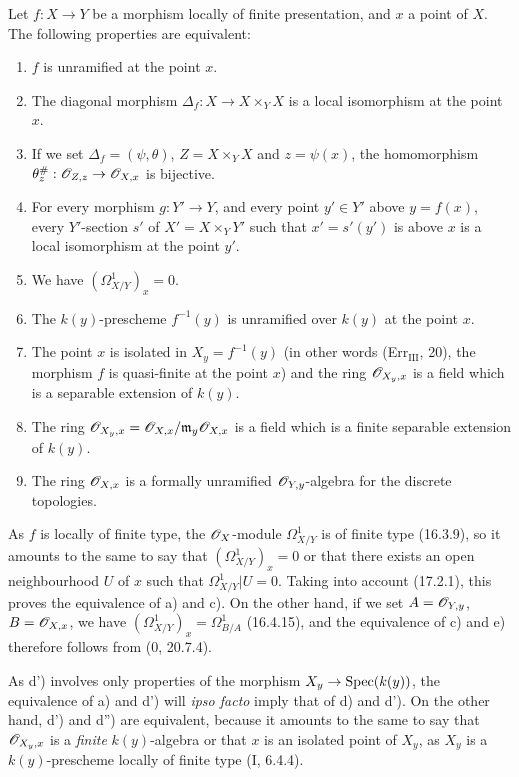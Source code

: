 \begin{theorem}[17.4.1]
\label{IV.17.4.1}
Let $f:X\to Y$ be a morphism locally of finite presentation, and $x$ a point of $X$. The following properties are equivalent:
\begin{enumerate}
  \item[a)] $f$ is unramified at the point $x$.
  \item[b)] The diagonal morphism $\Delta_f:X\to X\times_Y X$ is a local isomorphism at the point $x$.
  \item[b')] If we set $\Delta_f=(\psi,\theta)$, $Z=X\times_Y X$ and $z=\psi(x)$, the homomorphism $\theta_z^\#:\mathscr{O}_{Z,z}\to\mathscr{O}_{X,x}$ is bijective.
  \item[b'')] For every morphism $g:Y'\to Y$, and every point $y'\in Y'$ above $y=f(x)$, every $Y'$-section $s'$ of $X'=X\times_Y Y'$ such that $x'=s'(y')$ is above $x$ is a local isomorphism at the point $y'$.
  \item[c)] We have $(\Omega^1_{X/Y})_x=0$.
  \item[d)] The $k(y)$-prescheme $f^{-1}(y)$ is unramified over $k(y)$ at the point $x$.
  \item[d')] The point $x$ is isolated in $X_y=f^{-1}(y)$ (in other words (Err$_{\mathrm{III}}$, 20), the morphism $f$ is quasi-finite at the point $x$) and the ring $\mathscr{O}_{X_y,x}$ is a field which is a separable extension of $k(y)$.
  \item[d'')] The ring $\mathscr{O}_{X_y,x}=\mathscr{O}_{X,x}/\mathfrak{m}_y\mathscr{O}_{X,x}$ is a field which is a finite separable extension of $k(y)$.
  \item[e)] The ring $\mathscr{O}_{X,x}$ is a formally unramified $\mathscr{O}_{Y,y}$-algebra for the discrete topologies.
\end{enumerate}
\end{theorem}

As $f$ is locally of finite type, the $\mathscr{O}_X$-module $\Omega^1_{X/Y}$ is of finite type (16.3.9), so it amounts to the same to say that $(\Omega^1_{X/Y})_x=0$ or that there exists an open neighbourhood $U$ of $x$ such that $\Omega^1_{X/Y}|U=0$. Taking into account (17.2.1), this proves the equivalence of a) and c). On the other hand, if we set $A=\mathscr{O}_{Y,y}$, $B=\mathscr{O}_{X,x}$, we have $(\Omega^1_{X/Y})_x=\Omega^1_{B/A}$ (16.4.15), and the equivalence of c) and e) therefore follows from (0, 20.7.4).

As d') involves only properties of the morphism $X_y\to\operatorname{Spec}(k(y))$, the equivalence of a) and d') will \emph{ipso facto} imply that of d) and d'). On the other hand, d') and d'') are equivalent, because it amounts to the same to say that $\mathscr{O}_{X_y,x}$ is a \emph{finite} $k(y)$-algebra or that $x$ is an isolated point of $X_y$, as $X_y$ is a $k(y)$-prescheme locally of finite type (I, 6.4.4).

